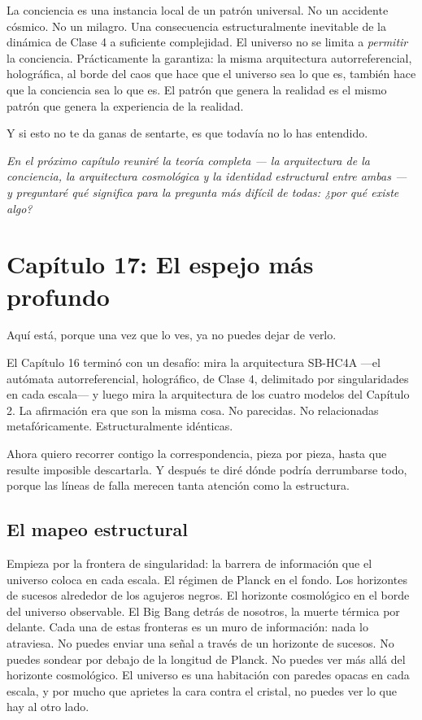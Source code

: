 \documentclass[11pt, twoside, openright]{book}
\begin{document}
La conciencia es una instancia local de un patrón universal. No un accidente cósmico. No un milagro. Una consecuencia estructuralmente inevitable de la dinámica de Clase 4 a suficiente complejidad. El universo no se limita a \textit{permitir} la conciencia. Prácticamente la garantiza: la misma arquitectura autorreferencial, holográfica, al borde del caos que hace que el universo sea lo que es, también hace que la conciencia sea lo que es. El patrón que genera la realidad es el mismo patrón que genera la experiencia de la realidad.

Y si esto no te da ganas de sentarte, es que todavía no lo has entendido.


\textit{En el próximo capítulo reuniré la teoría completa --- la arquitectura de la conciencia, la arquitectura cosmológica y la identidad estructural entre ambas --- y preguntaré qué significa para la pregunta más difícil de todas: ¿por qué existe algo?}


\chapter*{Capítulo 17: El espejo más profundo}

Aquí está, porque una vez que lo ves, ya no puedes dejar de verlo.

El Capítulo 16 terminó con un desafío: mira la arquitectura SB-HC4A ---el autómata autorreferencial, holográfico, de Clase 4, delimitado por singularidades en cada escala--- y luego mira la arquitectura de los cuatro modelos del Capítulo 2. La afirmación era que son la misma cosa. No parecidas. No relacionadas metafóricamente. Estructuralmente idénticas.

Ahora quiero recorrer contigo la correspondencia, pieza por pieza, hasta que resulte imposible descartarla. Y después te diré dónde podría derrumbarse todo, porque las líneas de falla merecen tanta atención como la estructura.

\section*{El mapeo estructural}

Empieza por la frontera de singularidad: la barrera de información que el universo coloca en cada escala. El régimen de Planck en el fondo. Los horizontes de sucesos alrededor de los agujeros negros. El horizonte cosmológico en el borde del universo observable. El Big Bang detrás de nosotros, la muerte térmica por delante. Cada una de estas fronteras es un muro de información: nada lo atraviesa. No puedes enviar una señal a través de un horizonte de sucesos. No puedes sondear por debajo de la longitud de Planck. No puedes ver más allá del horizonte cosmológico. El universo es una habitación con paredes opacas en cada escala, y por mucho que aprietes la cara contra el cristal, no puedes ver lo que hay al otro lado.
\end{document}
